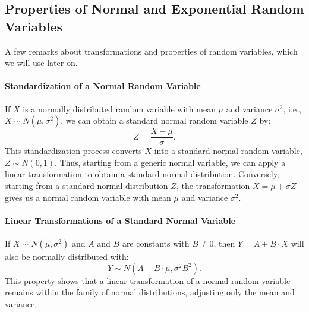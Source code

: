 \subsection{Properties of Normal and Exponential Random Variables}
A few remarks about transformations and properties of random variables, which we will use later on.

\paragraph{Standardization of a Normal Random Variable}
If \( X \) is a normally distributed random variable with mean \( \mu \) and variance \( \sigma^2 \), i.e., \( X \sim N(\mu, \sigma^2) \), we can obtain a standard normal random variable \( Z \) by:
\[
Z = \frac{X - \mu}{\sigma}.
\]
This standardization process converts \( X \) into a standard normal random variable, \( Z \sim N(0, 1) \). Thus, starting from a generic normal variable, we can apply a linear transformation to obtain a standard normal distribution. \newline
Conversely, starting from a standard normal distribution \( Z \), the transformation \( X = \mu + \sigma Z \) gives us a normal random variable with mean \( \mu \) and variance \( \sigma^2 \).

\paragraph{Linear Transformations of a Standard Normal Variable}
If \( X \sim N(\mu, \sigma^2) \) and \( A \) and \( B \) are constants with \( B \neq 0 \), then \( Y = A + B \cdot X \) will also be normally distributed with:
\[
Y \sim N(A + B \cdot \mu, \sigma^2 B^2).
\]
This property shows that a linear transformation of a normal random variable remains within the family of normal distributions, adjusting only the mean and variance.

